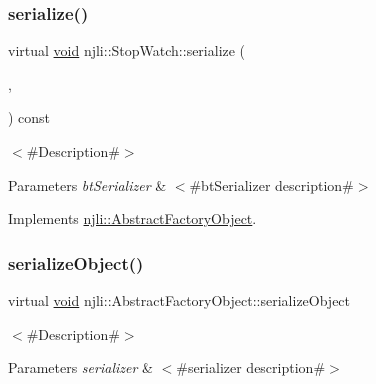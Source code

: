 \mbox{\label{classnjli_1_1_stop_watch_ae0d61d085799cf5f132cf92c65b48cdc}} 
\subsubsection{\texorpdfstring{serialize()}{serialize()}}
{\footnotesize\ttfamily virtual \mbox{\hyperlink{_thread_8h_af1e856da2e658414cb2456cb6f7ebc66}{void}} njli\+::\+Stop\+Watch\+::serialize (\begin{DoxyParamCaption}\item[{\mbox{\hyperlink{_thread_8h_af1e856da2e658414cb2456cb6f7ebc66}{void}} $\ast$}]{,  }\item[{bt\+Serializer $\ast$}]{ }\end{DoxyParamCaption}) const\hspace{0.3cm}{\ttfamily [virtual]}}

$<$\#\+Description\#$>$


\begin{DoxyParams}{Parameters}
{\em bt\+Serializer} & $<$\#bt\+Serializer description\#$>$ \\
\hline
\end{DoxyParams}


Implements \mbox{\hyperlink{classnjli_1_1_abstract_factory_object_aad2fbe86fb3bdecf02918a96b9c57976}{njli\+::\+Abstract\+Factory\+Object}}.

\mbox{\label{classnjli_1_1_stop_watch_a4fc4bcd9d1930911474210c047372fc0}} 
\subsubsection{\texorpdfstring{serialize\+Object()}{serializeObject()}}
{\footnotesize\ttfamily virtual \mbox{\hyperlink{_thread_8h_af1e856da2e658414cb2456cb6f7ebc66}{void}} njli\+::\+Abstract\+Factory\+Object\+::serialize\+Object}

$<$\#\+Description\#$>$


\begin{DoxyParams}{Parameters}
{\em serializer} & $<$\#serializer description\#$>$ \\
\hline
\end{DoxyParams}
\mbox{\label{classnjli_1_1_stop_watch_a087eb5f8d9f51cc476f12f1d10a3cb95}} 
